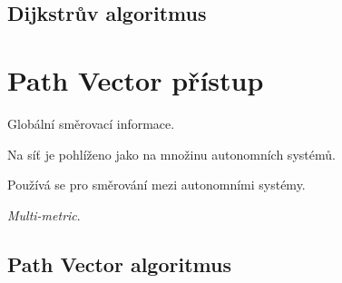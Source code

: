 \subsection*{Dijkstrův algoritmus}



\section{Path Vector přístup}

\begin{compactitem}
    \item Globální směrovací informace.
    \item Na síť je pohlíženo jako na množinu autonomních systémů.
    \item Používá se pro směrování mezi autonomními systémy.
    \item \textit{Multi-metric}.
\end{compactitem}

\subsection*{Path Vector algoritmus}

